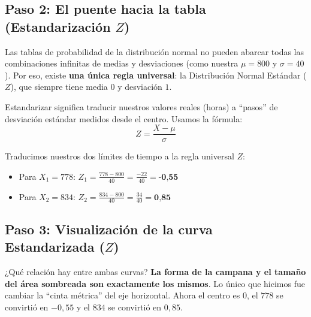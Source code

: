 \documentclass[11pt, a4paper]{article}
\begin{document}
\vspace{0.3cm}

\subsection*{Paso 2: El puente hacia la tabla (Estandarización $Z$)}
Las tablas de probabilidad de la distribución normal no pueden abarcar todas las combinaciones infinitas de medias y desviaciones (como nuestra $\mu=800$ y $\sigma=40$). Por eso, existe \textbf{una única regla universal}: la Distribución Normal Estándar ($Z$), que siempre tiene media $0$ y desviación $1$.

Estandarizar significa traducir nuestros valores reales (horas) a ``pasos'' de desviación estándar medidos desde el centro. Usamos la fórmula:
\[ Z = \frac{X - \mu}{\sigma} \]

Traducimos nuestros dos límites de tiempo a la regla universal $Z$:
\begin{itemize}
    \item Para $X_1 = 778$: \quad $Z_1 = \frac{778 - 800}{40} = \frac{-22}{40} = \textbf{-0,55}$
    \item Para $X_2 = 834$: \quad $Z_2 = \frac{834 - 800}{40} = \frac{34}{40} = \textbf{0,85}$
\end{itemize}

\subsection*{Paso 3: Visualización de la curva Estandarizada ($Z$)}
¿Qué relación hay entre ambas curvas? \textbf{La forma de la campana y el tamaño del área sombreada son exactamente los mismos}. Lo único que hicimos fue cambiar la ``cinta métrica'' del eje horizontal. Ahora el centro es $0$, el $778$ se convirtió en $-0,55$ y el $834$ se convirtió en $0,85$.
\end{document}
